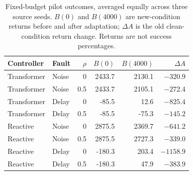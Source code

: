 \begin{table}[t]
\caption{Fixed-budget pilot outcomes, averaged equally across three source seeds. $B(0)$ and $B(4000)$ are new-condition returns before and after adaptation; $\Delta A$ is the old clean-condition return change. Returns are not success percentages.}
\label{tab:outcomes}
\centering\small
\begin{tabular*}{\textwidth}{@{\extracolsep{\fill}}llrrrr@{}}
\toprule
Controller & Fault & $\rho$ & $B(0)$ & $B(4000)$ & $\Delta A$ \\
\midrule
Transformer & Noise & 0 & 2433.7 & 2130.1 & $-320.9$ \\
Transformer & Noise & 0.5 & 2433.7 & 2105.1 & $-272.4$ \\
Transformer & Delay & 0 & -85.5 & 12.6 & $-825.4$ \\
Transformer & Delay & 0.5 & -85.5 & -75.3 & $-145.2$ \\
Reactive & Noise & 0 & 2875.5 & 2369.7 & $-641.2$ \\
Reactive & Noise & 0.5 & 2875.5 & 2727.3 & $-339.0$ \\
Reactive & Delay & 0 & -180.3 & 203.4 & $-1158.9$ \\
Reactive & Delay & 0.5 & -180.3 & 47.9 & $-383.9$ \\
\bottomrule
\end{tabular*}
\end{table}

